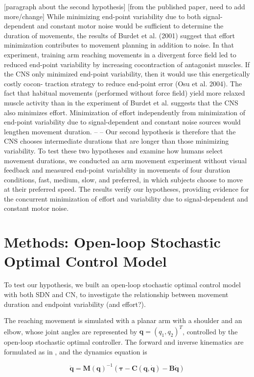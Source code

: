 [paragraph about the second hypothesis] [from the published paper, need to add more/change] While minimizing end-point variability due to both signal- dependent and constant motor noise would be sufficient to determine the duration of movements, the results of Burdet et al. (2001) suggest that effort minimization contributes to movement planning in addition to noise. In that experiment, training arm reaching movements in a divergent force field led to reduced end-point variability by increasing cocontraction of antagonist muscles. If the CNS only minimized end-point variability, then it would use this energetically costly cocon- traction strategy to reduce end-point error (Osu et al. 2004). The fact that habitual movements (performed without force field) yield more relaxed muscle activity than in the experiment of Burdet et al. suggests that the CNS also minimizes effort. Minimization of effort independently from minimization of end-point variability due to signal-dependent and constant noise sources would lengthen movement duration.  -- -- Our second hypothesis is therefore that the CNS chooses intermediate durations that are longer than those minimizing variability. To test these two hypotheses and examine how humans select movement durations, we conducted an arm movement experiment without visual feedback and measured end-point variability in movements of four duration conditions, fast, medium, slow, and preferred, in which subjects choose to move at their preferred speed. The results verify our hypotheses, providing evidence for the concurrent minimization of effort and variability due to signal-dependent and constant motor noise.

\section{Methods: Open-loop Stochastic Optimal Control Model}
To test our hypothesis, we built an open-loop stochastic optimal control model with both SDN and CN, to investigate the relationship between movement duration and endpoint variability (and effort?).

The reaching movement is simulated with a planar arm with a shoulder and an elbow, whose joint angles are represented by $\bm{q} = (q_1, q_2)^T$, controlled by the open-loop stochastic optimal controller. 
The forward and inverse kinematics are formulated as in \cite{VanBeers2004}, and the dynamics equation is

\begin{equation} \label{maindynamics}
	\ddot{\bm{q}} = \bm{M}(\bm{q})^{-1} (\bm{\tau} - \bm{C}(\bm{q}, \dot{\bm{q}}) - \bm{B}\dot{\bm{q}})
\end{equation}

